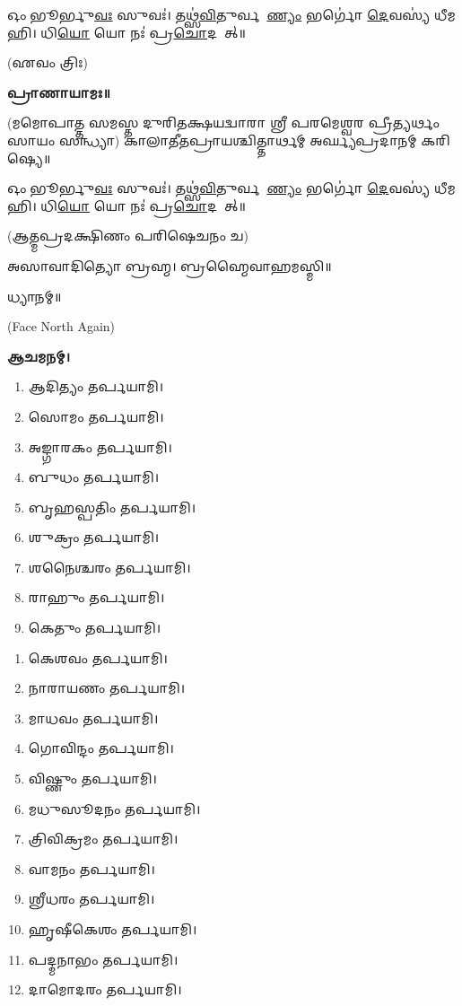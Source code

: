 𑌓𑌂 𑌭𑍂𑌰𑍍𑌭𑍁\ul{𑌵𑌃} 𑌸𑍁𑌵𑌃॑। 𑌤𑌥𑍍𑌸॑\ul{𑌵𑌿}𑌤𑍁𑌰𑍍𑌵𑌰𑍇᳚\ul{𑌣𑍍𑌯𑌂} 𑌭𑌰𑍍𑌗𑍋॑ \ul{𑌦𑍇}𑌵𑌸𑍍𑌯॑ 𑌧𑍀𑌮𑌹𑌿। 𑌧𑌿\ul{𑌯𑍋} 𑌯𑍋 𑌨𑌃॑ 𑌪𑍍𑌰\ul{𑌚𑍋}𑌦𑌯𑌾᳚𑌤𑍍॥

\hfill{(𑌏𑌵𑌂 𑌤𑍍𑌰𑌿𑌃)}


\textbf{𑌪𑍍𑌰𑌾𑌣𑌾𑌯𑌾𑌮𑌃॥}

(𑌮𑌮𑍋𑌪𑌾𑌤𑍍𑌤 𑌸𑌮𑌸𑍍𑌤 𑌦𑍁𑌰𑌿𑌤𑌕𑍍𑌷𑌯𑌦𑍍𑌵𑌾𑌰𑌾 𑌶𑍍𑌰𑍀 𑌪𑌰𑌮𑍇𑌶𑍍𑌵𑌰 𑌪𑍍𑌰𑍀𑌤𑍍𑌯𑌰𑍍𑌥𑌂 𑌸𑌾𑌯𑌂 𑌸𑌨𑍍𑌧𑍍𑌯𑌾)
𑌕𑌾𑌲𑌾𑌤𑍀𑌤𑌪𑍍𑌰𑌾𑌯𑌶𑍍𑌚𑌿𑌤𑍍𑌤𑌾𑌰𑍍𑌥𑌮𑍍 𑌅𑌰𑍍𑌘𑍍𑌯𑌪𑍍𑌰𑌦𑌾𑌨𑌮𑍍 𑌕𑌰𑌿𑌷𑍍𑌯𑍇॥

𑌓𑌂 𑌭𑍂𑌰𑍍𑌭𑍁\ul{𑌵𑌃} 𑌸𑍁𑌵𑌃॑। 𑌤𑌥𑍍𑌸॑\ul{𑌵𑌿}𑌤𑍁𑌰𑍍𑌵𑌰𑍇᳚\ul{𑌣𑍍𑌯𑌂} 𑌭𑌰𑍍𑌗𑍋॑ \ul{𑌦𑍇}𑌵𑌸𑍍𑌯॑ 𑌧𑍀𑌮𑌹𑌿। 𑌧𑌿\ul{𑌯𑍋} 𑌯𑍋 𑌨𑌃॑ 𑌪𑍍𑌰\ul{𑌚𑍋}𑌦𑌯𑌾᳚𑌤𑍍॥

(𑌆𑌤𑍍𑌮𑌪𑍍𑌰𑌦𑌕𑍍𑌷𑌿𑌣𑌂 𑌪𑌰𑌿𑌷𑍇𑌚𑌨𑌂 𑌚)


𑌅𑌸𑌾𑌵𑌾𑌦𑌿𑌤𑍍𑌯𑍋 𑌬𑍍𑌰𑌹𑍍𑌮। 𑌬𑍍𑌰𑌹𑍍𑌮𑍈𑌵𑌾𑌹𑌮𑌸𑍍𑌮𑌿॥

𑌧𑍍𑌯𑌾𑌨𑌮𑍍॥

{\scriptsize (Face North Again)}

\textbf{𑌆𑌚𑌮𑌨𑌮𑍍।}



\begin{enumerate}
 \item 𑌆𑌦𑌿𑌤𑍍𑌯𑌂 𑌤𑌰𑍍𑌪𑌯𑌾𑌮𑌿।
 \item 𑌸𑍋𑌮𑌂 𑌤𑌰𑍍𑌪𑌯𑌾𑌮𑌿।
 \item 𑌅𑌙𑍍𑌗𑌾𑌰𑌕𑌂 𑌤𑌰𑍍𑌪𑌯𑌾𑌮𑌿।
 \item 𑌬𑍁𑌧𑌂 𑌤𑌰𑍍𑌪𑌯𑌾𑌮𑌿।
 \item 𑌬𑍃𑌹𑌸𑍍𑌪𑌤𑌿𑌂 𑌤𑌰𑍍𑌪𑌯𑌾𑌮𑌿।
 \item 𑌶𑍁𑌕𑍍𑌰𑌂 𑌤𑌰𑍍𑌪𑌯𑌾𑌮𑌿।
 \item 𑌶𑌨𑍈𑌶𑍍𑌚𑌰𑌂 𑌤𑌰𑍍𑌪𑌯𑌾𑌮𑌿।
 \item 𑌰𑌾𑌹𑍁𑌂 𑌤𑌰𑍍𑌪𑌯𑌾𑌮𑌿।
 \item 𑌕𑍇𑌤𑍁𑌂 𑌤𑌰𑍍𑌪𑌯𑌾𑌮𑌿।
\end{enumerate}


\begin{enumerate}
\item 𑌕𑍇𑌶𑌵𑌂 𑌤𑌰𑍍𑌪𑌯𑌾𑌮𑌿।
\item 𑌨𑌾𑌰𑌾𑌯𑌣𑌂 𑌤𑌰𑍍𑌪𑌯𑌾𑌮𑌿।
\item 𑌮𑌾𑌧𑌵𑌂 𑌤𑌰𑍍𑌪𑌯𑌾𑌮𑌿।
\item 𑌗𑍋𑌵𑌿𑌨𑍍𑌦𑌂 𑌤𑌰𑍍𑌪𑌯𑌾𑌮𑌿।
\item 𑌵𑌿𑌷𑍍𑌣𑍁𑌂 𑌤𑌰𑍍𑌪𑌯𑌾𑌮𑌿।
\item 𑌮𑌧𑍁𑌸𑍂𑌦𑌨𑌂 𑌤𑌰𑍍𑌪𑌯𑌾𑌮𑌿।
\item 𑌤𑍍𑌰𑌿𑌵𑌿𑌕𑍍𑌰𑌮𑌂 𑌤𑌰𑍍𑌪𑌯𑌾𑌮𑌿।
\item 𑌵𑌾𑌮𑌨𑌂 𑌤𑌰𑍍𑌪𑌯𑌾𑌮𑌿।
\item 𑌶𑍍𑌰𑍀𑌧𑌰𑌂 𑌤𑌰𑍍𑌪𑌯𑌾𑌮𑌿।
\item 𑌹𑍃𑌷𑍀𑌕𑍇𑌶𑌂 𑌤𑌰𑍍𑌪𑌯𑌾𑌮𑌿।
\item 𑌪𑌦𑍍𑌮𑌨𑌾𑌭𑌂 𑌤𑌰𑍍𑌪𑌯𑌾𑌮𑌿।
\item 𑌦𑌾𑌮𑍋𑌦𑌰𑌂 𑌤𑌰𑍍𑌪𑌯𑌾𑌮𑌿।
\end{enumerate}

